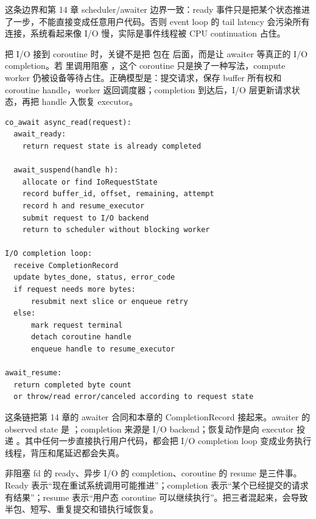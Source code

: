 这条边界和第 14 章 scheduler/awaiter 边界一致：ready 事件只是把某个状态推进了一步，不能直接变成任意用户代码。否则 event loop 的 tail latency 会污染所有连接，系统看起来像 I/O 慢，实际是事件线程被 CPU continuation 占住。

把 I/O 接到 coroutine 时，关键不是把  包在  后面，而是让 awaiter 等真正的 I/O completion。若  里调用阻塞 ，这个 coroutine 只是换了一种写法，compute worker 仍被设备等待占住。正确模型是：提交请求，保存 buffer 所有权和 coroutine handle，worker 返回调度器；completion 到达后，I/O 层更新请求状态，再把 handle 入恢复 executor。

\begin{lstlisting}[numbers=none,caption={异步 I/O awaiter 的事件链}]
co_await async_read(request):
  await_ready:
    return request state is already completed

  await_suspend(handle h):
    allocate or find IoRequestState
    record buffer_id, offset, remaining, attempt
    record h and resume_executor
    submit request to I/O backend
    return to scheduler without blocking worker

I/O completion loop:
  receive CompletionRecord
  update bytes_done, status, error_code
  if request needs more bytes:
      resubmit next slice or enqueue retry
  else:
      mark request terminal
      detach coroutine handle
      enqueue handle to resume_executor

await_resume:
  return completed byte count
  or throw/read error/canceled according to request state
\end{lstlisting}

这条链把第 14 章的 awaiter 合同和本章的 CompletionRecord 接起来。awaiter 的 observed state 是 ；completion 来源是 I/O backend；恢复动作是向 executor 投递 。其中任何一步直接执行用户代码，都会把 I/O completion loop 变成业务执行线程，背压和尾延迟都会失真。

非阻塞 fd 的 ready、异步 I/O 的 completion、coroutine 的 resume 是三件事。Ready 表示“现在重试系统调用可能推进”；completion 表示“某个已经提交的请求有结果”；resume 表示“用户态 coroutine 可以继续执行”。把三者混起来，会导致半包、短写、重复提交和错执行域恢复。

